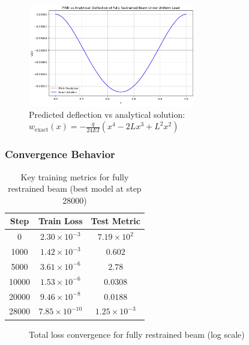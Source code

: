 \documentclass[12pt]{article}
\begin{document}
\begin{figure}[htbp]
    \centering
    \includegraphics[width=0.65\textwidth]{restrained_results.png}
    \caption{Predicted deflection vs analytical solution: $w_{\text{exact}}(x) = -\frac{q}{24EI}(x^4 - 2Lx^3 + L^2x^2)$}
    \label{fig:restrained}
\end{figure}

\subsubsection{Convergence Behavior}
\begin{table}[htbp]
    \centering
    \begin{tabular}{c c c}
        \toprule
        \textbf{Step} & \textbf{Train Loss} & \textbf{Test Metric} \\
        \midrule
        0 & $2.30 \times 10^{-3}$ & $7.19 \times 10^{2}$ \\
        1000 & $1.42 \times 10^{-3}$ & $0.602$ \\
        5000 & $3.61 \times 10^{-6}$ & $2.78$ \\
        10000 & $1.53 \times 10^{-6}$ & $0.0308$ \\
        20000 & $9.46 \times 10^{-8}$ & $0.0188$ \\
        28000 & $7.85 \times 10^{-10}$ & $1.25 \times 10^{-3}$ \\
        \bottomrule
    \end{tabular}
    \caption{Key training metrics for fully restrained beam (best model at step 28000)}
\end{table}

\begin{figure}[htbp]
    \centering
    \caption{Total loss convergence for fully restrained beam (log scale)}
    \label{fig:restrained_convergence}
\end{figure}
\end{document}
